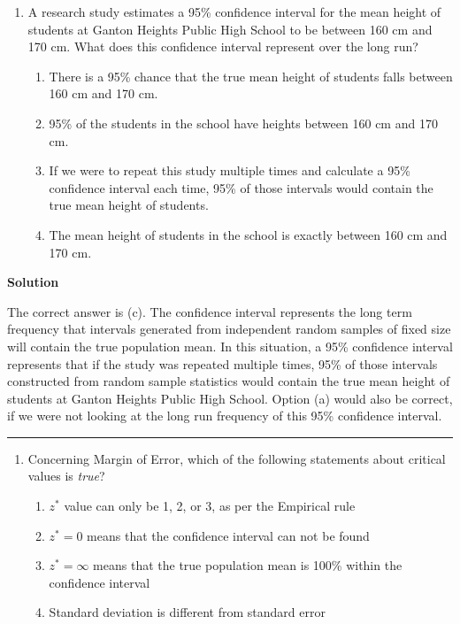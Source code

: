 \documentclass[
  letterpaper,
  DIV=11,
  numbers=noendperiod,
  oneside]{scrreprt}
\providecommand{\tightlist}{%
  \setlength{\itemsep}{0pt}\setlength{\parskip}{0pt}}\usepackage{longtable,booktabs,array}
\begin{document}
\begin{enumerate}
\def\labelenumi{\arabic{enumi}.}
\setcounter{enumi}{1}
\tightlist
\item
  A research study estimates a 95\% confidence interval for the mean
  height of students at Ganton Heights Public High School to be between
  160 cm and 170 cm. What does this confidence interval represent over
  the long run?

  \begin{enumerate}
  \def\labelenumii{\alph{enumii}.}
  \tightlist
  \item
    There is a 95\% chance that the true mean height of students falls
    between 160 cm and 170 cm.
  \item
    95\% of the students in the school have heights between 160 cm and
    170 cm.
  \item
    If we were to repeat this study multiple times and calculate a 95\%
    confidence interval each time, 95\% of those intervals would contain
    the true mean height of students.
  \item
    The mean height of students in the school is exactly between 160 cm
    and 170 cm.
  \end{enumerate}
\end{enumerate}

\textbf{Solution}

The correct answer is (c). The confidence interval represents the long
term frequency that intervals generated from independent random samples
of fixed size will contain the true population mean. In this situation,
a 95\% confidence interval represents that if the study was repeated
multiple times, 95\% of those intervals constructed from random sample
statistics would contain the true mean height of students at Ganton
Heights Public High School. Option (a) would also be correct, if we were
not looking at the long run frequency of this 95\% confidence interval.

\begin{center}\rule{0.5\linewidth}{0.5pt}\end{center}

\begin{enumerate}
\def\labelenumi{\arabic{enumi}.}
\setcounter{enumi}{2}
\tightlist
\item
  Concerning Margin of Error, which of the following statements about
  critical values is \emph{true}?

  \begin{enumerate}
  \def\labelenumii{\alph{enumii}.}
  \tightlist
  \item
    \(z^*\) value can only be 1, 2, or 3, as per the Empirical rule
  \item
    \(z^* = 0\) means that the confidence interval can not be found
  \item
    \(z^* = \infty\) means that the true population mean is 100\% within
    the confidence interval
  \item
    Standard deviation is different from standard error
  \end{enumerate}
\end{enumerate}
\end{document}
